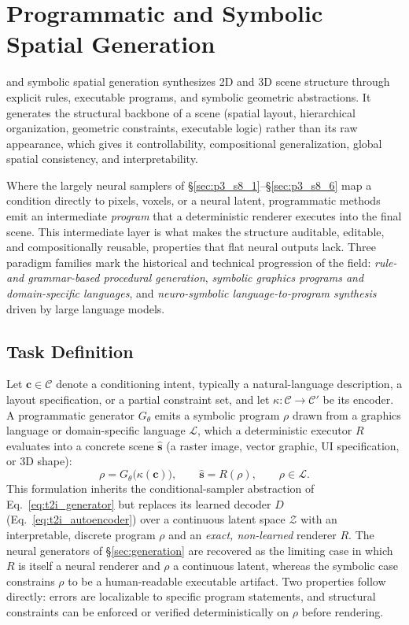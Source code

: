 \section{Programmatic and Symbolic Spatial Generation}
\label{sec:p3_s8_7}

 and symbolic spatial generation synthesizes 2D and 3D scene structure through explicit rules, executable programs, and symbolic geometric abstractions.
It generates the structural backbone of a scene (spatial layout, hierarchical organization, geometric constraints, executable logic) rather than its raw appearance, which gives it controllability, compositional generalization, global spatial consistency, and interpretability.

Where the largely neural samplers of §\ref{sec:p3_s8_1}–§\ref{sec:p3_s8_6} map a condition directly to pixels, voxels, or a neural latent, programmatic methods emit an intermediate \emph{program} that a deterministic renderer executes into the final scene.
This intermediate layer is what makes the structure auditable, editable, and compositionally reusable, properties that flat neural outputs lack.
Three paradigm families mark the historical and technical progression of the field: \emph{rule- and grammar-based procedural generation}, \emph{symbolic graphics programs and domain-specific languages}, and \emph{neuro-symbolic language-to-program synthesis} driven by large language models.

\subsection{Task Definition}
\label{subsubsec:p3_s8_7_task}

Let $\mathbf{c}\in\mathcal{C}$ denote a conditioning intent, typically a natural-language description, a layout specification, or a partial constraint set, and let $\kappa:\mathcal{C}\!\to\!\mathcal{C}'$ be its encoder.
A programmatic generator $G_\theta$ emits a symbolic program $\rho$ drawn from a graphics language or domain-specific language $\mathcal{L}$, which a deterministic executor $R$ evaluates into a concrete scene $\hat{\mathbf{s}}$ (a raster image, vector graphic, UI specification, or 3D shape):
\begin{equation}
\label{eq:p3_s8_7_objective}
\rho = G_\theta\big(\kappa(\mathbf{c})\big), \qquad \hat{\mathbf{s}} = R(\rho), \qquad \rho \in \mathcal{L}.
\end{equation}
This formulation inherits the conditional-sampler abstraction of Eq.~\eqref{eq:t2i_generator} but replaces its learned decoder $D$ (Eq.~\eqref{eq:t2i_autoencoder}) over a continuous latent space $\mathcal{Z}$ with an interpretable, discrete program $\rho$ and an \emph{exact, non-learned} renderer $R$.
The neural generators of §\ref{sec:generation} are recovered as the limiting case in which $R$ is itself a neural renderer and $\rho$ a continuous latent, whereas the symbolic case constrains $\rho$ to be a human-readable executable artifact.
Two properties follow directly: errors are localizable to specific program statements, and structural constraints can be enforced or verified deterministically on $\rho$ before rendering.



